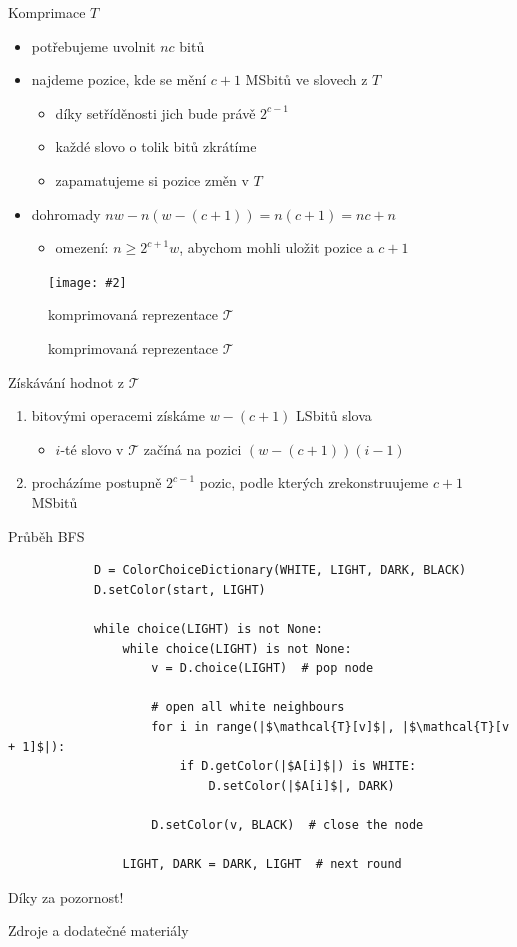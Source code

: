 \documentclass[czech]{beamer}
\makeatletter
\newcommand{\fitimage}[2][\@nil]{
	\begin{figure}
		\begin{adjustbox}{width=0.9\textwidth, totalheight=\textheight-2\baselineskip-2\baselineskip,keepaspectratio}
			\texttt{[image: \#2]}
		\end{adjustbox}
		\def\tmp{#1}%
	 \ifx\tmp\@nnil
			\else
			\caption{#1}
		\fi
	\end{figure}
}
\makeatother
\begin{document}
	\begin{frame}{Komprimace $T$}
		\begin{itemize}
			\item potřebujeme uvolnit $nc$ bitů
				\vfill
			\item najdeme pozice, kde se mění $c + 1$ MSbitů ve slovech z $T$
			\begin{itemize}
				\item díky setříděnosti jich bude právě $2^{c - 1}$
				\item každé slovo o tolik bitů zkrátíme
				\item zapamatujeme si pozice změn v $T$
			\end{itemize}
				\vfill
			\item dohromady $nw - n(w - (c + 1)) = n(c + 1) = nc + n$
			\begin{itemize}
				\item omezení: $n \ge 2^{c + 1}w$, abychom mohli uložit pozice a $c + 1$
			\end{itemize}
		\end{itemize}

		\fitimage[komprimovaná reprezentace $\mathcal{T}$]{images/compression.png}
	\end{frame}

	\begin{frame}{Získávání hodnot z $\mathcal{T}$}
		\begin{enumerate}
			\item bitovými operacemi získáme $w - (c + 1)$ LSbitů slova
			\begin{itemize}
				\item $i$-té slovo v $\mathcal{T}$ začíná na pozici $(w - (c + 1))(i - 1)$
			\end{itemize}
			\item procházíme postupně $2^{c - 1}$ pozic, podle kterých zrekonstruujeme $c + 1$ MSbitů
		\end{enumerate}
	\end{frame}


	\begin{frame}[fragile]{Průběh BFS}
		\small
		\begin{verbatim}
			D = ColorChoiceDictionary(WHITE, LIGHT, DARK, BLACK)
			D.setColor(start, LIGHT)

			while choice(LIGHT) is not None:
				while choice(LIGHT) is not None:
					v = D.choice(LIGHT)  # pop node

					# open all white neighbours
					for i in range(|$\mathcal{T}[v]$|, |$\mathcal{T}[v + 1]$|):
						if D.getColor(|$A[i]$|) is WHITE:
							D.setColor(|$A[i]$|, DARK)

					D.setColor(v, BLACK)  # close the node

				LIGHT, DARK = DARK, LIGHT  # next round
		\end{verbatim}
	\end{frame}

	\begin{frame}[focus]
		Díky za pozornost!
	\end{frame}
	
	\appendix
	\begin{frame}{Zdroje a dodatečné materiály}
		\nocite{*}
		
		
	\end{frame}
\end{document}
